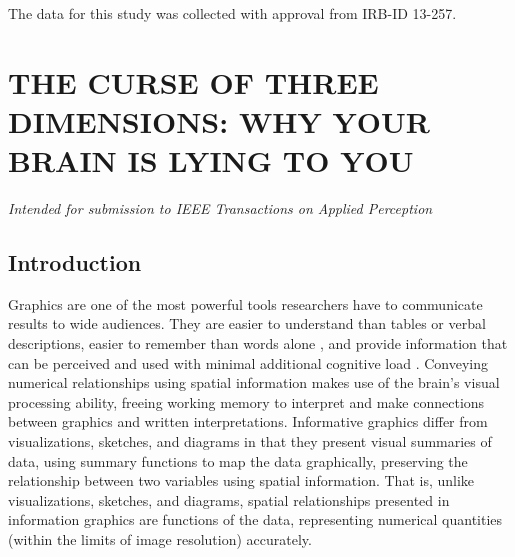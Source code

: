 \documentclass[11pt]{isuthesis}\usepackage[]{graphicx}\usepackage[]{color}
\begin{document}
The data for this study was collected with approval from  IRB-ID 13-257.



\graphicspath{{Figure/lieFactorSine/}{Images/lieFactorSine/}}
\renewcommand{\floatpagefraction}{.99}
% 
% 





\chapter{THE CURSE OF THREE DIMENSIONS: WHY YOUR BRAIN IS LYING TO YOU}\label{LieFactorChapter}\label{liefactor}

\noindent\hfil\textit{Intended for submission to IEEE Transactions on Applied Perception}\hfil


\section{Introduction}
Graphics are one of the most powerful tools researchers have to communicate results to wide audiences. They are easier to understand than tables or verbal descriptions\citep{larkin1987diagram}, easier to remember than words alone \citep{mayer1994whom}, and provide information that can be perceived and used with minimal additional cognitive load \citep{zhang1994representations}. Conveying numerical relationships using spatial information makes use of the brain's visual processing ability, freeing working memory to interpret and make connections between graphics and written interpretations. Informative graphics differ from visualizations, sketches, and diagrams in that they present visual summaries of data, using summary functions to map the data graphically, preserving the relationship between two variables using spatial information. That is, unlike visualizations, sketches, and diagrams, spatial relationships presented in information graphics are functions of the data, representing numerical quantities (within the limits of image resolution) accurately. 
\end{document}
